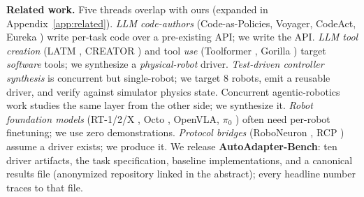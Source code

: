 \noindent\textbf{Related work.}
Five threads overlap with ours (expanded in
Appendix~\ref{app:related}). \emph{LLM code-authors}
(Code-as-Policies, Voyager, CodeAct, Eureka \citep{ma2024eureka})
write per-task code over a pre-existing API; we write the API. \emph{LLM tool
creation} (LATM \citep{cai2023latm}, CREATOR
\citep{qian2023creator}) and tool \emph{use} (Toolformer
\citep{schick2023toolformer}, Gorilla \citep{patil2023gorilla})
target \emph{software} tools; we synthesize a \emph{physical-robot}
driver. \emph{Test-driven
controller synthesis} \citep{tripathi2026testdriven} is concurrent
but single-robot; we target 8 robots, emit a reusable driver, and
verify against simulator physics state.
Concurrent agentic-robotics work \citep{enpire2026, capx2026} studies
the same layer from the other side; we synthesize it.
\emph{Robot foundation models} (RT-1/2/X
\citep{brohan2022rt1, brohan2023rt2, openxembodiment2024}, Octo
\citep{octo2024}, OpenVLA, $\pi_0$ \citep{black2024pi0}) often need
per-robot finetuning; we use zero demonstrations. \emph{Protocol
bridges} (RoboNeuron \citep{roboneuron2025}, RCP \citep{rcp2025})
assume a driver exists; we produce it. We
release \textbf{AutoAdapter-Bench}: ten driver artifacts, the
task specification, baseline implementations, and a canonical
results file (anonymized repository linked in the abstract);
every headline number traces to that file.
